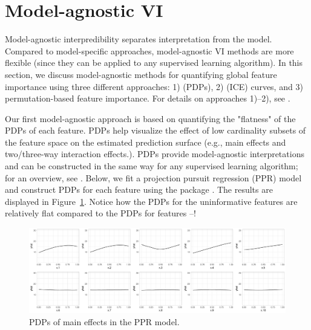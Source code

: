 \section{Model-agnostic VI}

Model-agnostic interpredibility separates interpretation from the model. Compared to model-specific approaches, model-agnostic VI methods are more flexible (since they can be applied to any supervised learning algorithm). In this section, we discuss model-agnostic methods for quantifying global feature importance using three different approaches: 1)  (PDPs), 2)  (ICE) curves, and 3) permutation-based feature importance. For details on approaches 1)--2), see \citet{greenwell-simple-2018}.

Our first model-agnostic approach is based on quantifying the "flatness" of the PDPs of each feature. PDPs help visualize the effect of low cardinality subsets of the feature space on the estimated prediction surface (e.g., main effects and two/three-way interaction effects.). PDPs provide model-agnostic interpretations and can be constructed in the same way for any supervised learning algorithm; for an overview, see \citet{greenwell-pdp-2017}. Below, we fit a projection pursuit regression (PPR) model and construct PDPs for each feature using the  package \citet{greenwell-pdp-2017}. The results are displayed in Figure~\ref{fig:pdp-ppr}. Notice how the PDPs for the uninformative features are relatively flat compared to the PDPs for features --!


\begin{figure}[!htb]
  \centering 
  \includegraphics[width=1\linewidth]{figures/pdp-ppr} 
  \caption{PDPs of main effects in the PPR model.}
  \label{fig:pdp-ppr}
\end{figure}

